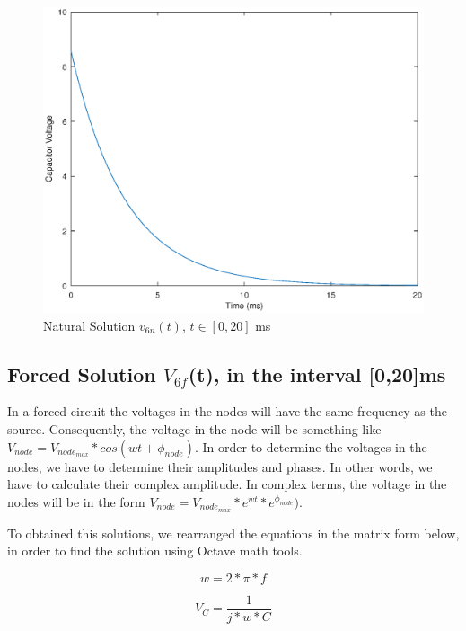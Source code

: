 \begin{figure}[!h] \centering
\includegraphics[width=0.7\linewidth]{naturalsolution.eps}
\caption{Natural Solution $v_{6n}(t)$, $t\in[0,20]$ ms}
\label{fig:snat}
\end{figure}


\newpage
\subsection{Forced Solution $V_{6f}$(t), in the interval [0,20]ms}

\par In a forced circuit the voltages in the nodes will have the same frequency as the source. Consequently, the voltage in the node will be something like $V_{node} = V_{node_{max}}*cos(wt + \phi_{node})$. In order to determine the voltages in the nodes, we have to determine their amplitudes and phases. In other words, we have to calculate their complex amplitude. In complex terms, the voltage in the nodes will be in the form $V_{node} =
V_{node_{max}}*e^{wt}*e^{\phi_{node}})$.

\par To obtained this solutions, we rearranged the equations in the matrix form below, in order to find the solution using Octave math tools.

\begin{equation}
    w= 2*\pi*f
\end{equation}

\begin{equation}
    V_C = \frac{1}{j*w*C}
\end{equation}

